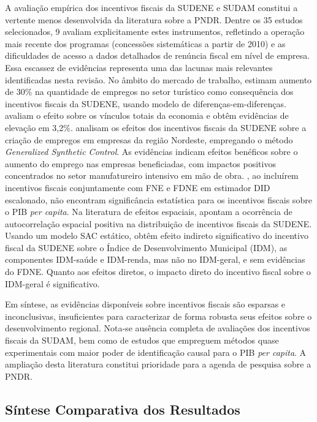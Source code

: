 A avaliação empírica dos incentivos fiscais da SUDENE e SUDAM constitui a vertente menos desenvolvida da literatura sobre a PNDR. Dentre os 35 estudos selecionados, 9 avaliam explicitamente estes instrumentos, refletindo a operação mais recente dos programas (concessões sistemáticas a partir de 2010) e as dificuldades de acesso a dados detalhados de renúncia fiscal em nível de empresa. Essa escassez de evidências representa uma das lacunas mais relevantes identificadas nesta revisão. No âmbito do mercado de trabalho,  estimam aumento de 30\% na quantidade de empregos no setor turístico como consequência dos incentivos fiscais da SUDENE, usando modelo de diferenças-em-diferenças.  avaliam o efeito sobre os vínculos totais da economia e obtêm evidências de elevação em 3,2\%.  analisam os efeitos dos incentivos fiscais da SUDENE sobre a criação de empregos em empresas da região Nordeste, empregando o método \textit{Generalized Synthetic Control}. As evidências indicam efeitos benéficos sobre o aumento do emprego nas empresas beneficiadas, com impactos positivos concentrados no setor manufatureiro intensivo em mão de obra. , ao incluírem incentivos fiscais conjuntamente com FNE e FDNE em estimador DID escalonado, não encontram significância estatística para os incentivos fiscais sobre o PIB \textit{per capita}. Na literatura de efeitos espaciais,  apontam a ocorrência de autocorrelação espacial positiva na distribuição de incentivos fiscais da SUDENE. Usando um modelo SAC estático, obtêm efeito indireto significativo do incentivo fiscal da SUDENE sobre o Índice de Desenvolvimento Municipal (IDM), as componentes IDM-saúde e IDM-renda, mas não no IDM-geral, e sem evidências do FDNE. Quanto aos efeitos diretos, o impacto direto do incentivo fiscal sobre o IDM-geral é significativo.

Em síntese, as evidências disponíveis sobre incentivos fiscais são esparsas e inconclusivas, insuficientes para caracterizar de forma robusta seus efeitos sobre o desenvolvimento regional. Nota-se ausência completa de avaliações dos incentivos fiscais da SUDAM, bem como de estudos que empreguem métodos quase experimentais com maior poder de identificação causal para o PIB \textit{per capita}. A ampliação desta literatura constitui prioridade para a agenda de pesquisa sobre a PNDR.

\subsection{Síntese Comparativa dos Resultados}

